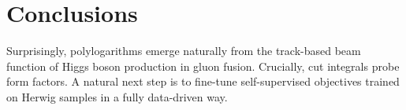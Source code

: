 \section{Conclusions}\label{sec:conclusions}

Surprisingly, polylogarithms emerge naturally from the track-based beam
function of Higgs boson production in gluon fusion. Crucially, cut
integrals probe form factors. A natural next step is to fine-tune
self-supervised objectives trained on Herwig samples in a fully
data-driven way.


